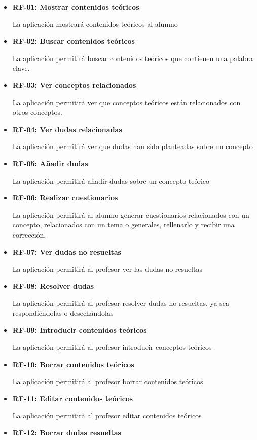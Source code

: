 \documentclass[openright,twoside,10pt]{book}
\begin{document}
    \begin{itemize}
    \item
      \textbf{RF-01: Mostrar contenidos teóricos}
    
      La aplicación mostrará contenidos teóricos al alumno
    \item
      \textbf{RF-02: Buscar contenidos teóricos}
    
      La aplicación permitirá buscar contenidos teóricos que contienen una
      palabra clave.
    \item
      \textbf{RF-03: Ver conceptos relacionados}
    
      La aplicación permitirá ver que conceptos teóricos están relacionados
      con otros conceptos.
    \item
      \textbf{RF-04: Ver dudas relacionadas}
    
      La aplicación permitirá ver que dudas han sido planteadas sobre un
      concepto
    \item
      \textbf{RF-05: Añadir dudas}
    
      La aplicación permitirá añadir dudas sobre un concepto teórico
    \item
      \textbf{RF-06: Realizar cuestionarios}
    
      La aplicación permitirá al alumno generar cuestionarios relacionados
      con un concepto, relacionados con un tema o generales, rellenarlo y
      recibir una corrección.
    \item
      \textbf{RF-07: Ver dudas no resueltas}
    
      La aplicación permitirá al profesor ver las dudas no resueltas
    \item
      \textbf{RF-08: Resolver dudas}
    
      La aplicación permitirá al profesor resolver dudas no resueltas, ya
      sea respondiéndolas o desechándolas
    \item
      \textbf{RF-09: Introducir contenidos teóricos}
    
      La aplicación permitirá al profesor introducir conceptos teóricos
    \item
      \textbf{RF-10: Borrar contenidos teóricos}
    
      La aplicación permitirá al profesor borrar contenidos teóricos
    \item
      \textbf{RF-11: Editar contenidos teóricos}
    
      La aplicación permitirá al profesor editar contenidos teóricos
    \item
      \textbf{RF-12: Borrar dudas resueltas}
    

\end{itemize}
\end{document}
